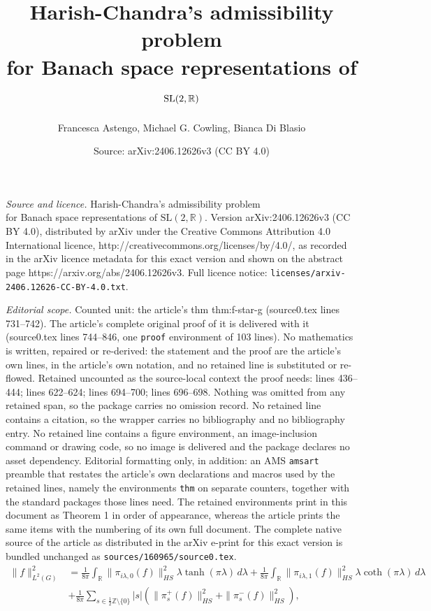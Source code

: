 \documentclass[10pt,a4paper]{amsart}
\title{Harish-Chandra's admissibility problem \\ for Banach space representations of $\mathrm{SL}(2,\R)$}
\author{Francesca Astengo, Michael G. Cowling, Bianca Di Blasio}
\date{Source: arXiv:2406.12626v3 (CC BY 4.0)}
\newcommand{\R}{\mathbb{R}}
\newcommand{\Z}{\mathbb{Z}}
\begin{document}
\maketitle

\noindent\emph{Source and licence.} Harish-Chandra's admissibility problem \\ for Banach space representations of $\mathrm{SL}(2,\R)$. Version arXiv:2406.12626v3 (CC BY 4.0), distributed by arXiv under the Creative Commons Attribution 4.0 International licence, http://creativecommons.org/licenses/by/4.0/, as recorded in the arXiv licence metadata for this exact version and shown on the abstract page https://arxiv.org/abs/2406.12626v3. Full licence notice: \texttt{licenses/arxiv-2406.12626-CC-BY-4.0.txt}.\par\smallskip

\noindent\textit{Editorial scope.} Counted unit: the article's thm thm:f-star-g (source0.tex lines 731--742). The article's complete original proof of it is delivered with it (source0.tex lines 744--846, one \texttt{proof} environment of 103 lines). No mathematics is written, repaired or re-derived: the statement and the proof are the article's own lines, in the article's own notation, and no retained line is substituted or re-flowed.  Retained uncounted as the source-local context the proof needs: lines 436--444; lines 622--624; lines 694--700; lines 696--698.  Nothing was omitted from any retained span, so the package carries no omission record.  No retained line contains a citation, so the wrapper carries no bibliography and no bibliography entry.  No retained line contains a figure environment, an image-inclusion command or drawing code, so no image is delivered and the package declares no asset dependency.  Editorial formatting only, in addition: an AMS \texttt{amsart} preamble that restates the article's own declarations and macros used by the retained lines, namely the environments \texttt{thm} on separate counters, together with the standard packages those lines need.  The retained environments print in this document as Theorem 1 in order of appearance, whereas the article prints the same items with the numbering of its own full document.  The complete native source of the article as distributed in the arXiv e-print for this exact version is bundled unchanged as \texttt{sources/160965/source0.tex}.
\begin{equation}\label{e:plancherel}
\begin{aligned}
\|f\|_{L^2(G)}^2&=\frac{1}{8\pi} \int_\R \|\pi_{i\lambda,0}(f)\|_{HS}^2 \lambda\tanh(\pi\lambda)\, d\lambda
+
 \frac{1}{8\pi} \int_\R \|\pi_{i\lambda,1}(f)\|_{HS}^2 \lambda\coth(\pi\lambda)\, d\lambda
 \\
 &+\frac{1}{8\pi} \sum_{s\in \frac12 \Z \setminus\{0\}} |s| \left(\|\pi_s^+(f)\|_{HS}^2 +\|\pi_s^-(f)\|_{HS}^2 \right) ,
\end{aligned}
\end{equation}
\end{document}
